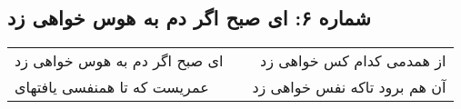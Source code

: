 \begin{center}
\section*{شماره ۶: ای صبح اگر دم به هوس خواهی زد}
\label{sec:006}
\begin{longtable}{l p{0.5cm} r}
ای صبح اگر دم به هوس خواهی زد
&&
از همدمی کدام کس خواهی زد
\\
عمریست که تا همنفسی یافتهای
&&
آن هم برود تاکه نفس خواهی زد
\\
\end{longtable}
\end{center}
